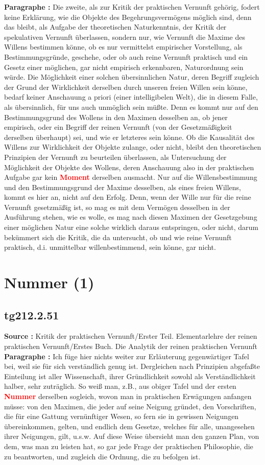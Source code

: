 \documentclass[a4paper,12pt,twoside]{book}
\newcommand{\match}[1]{\textcolor{red}{\textbf{#1}}}
\newcommand{\unnumberedsection}[1]{
	\section*{#1}
	\addcontentsline{toc}{section}{#1}
	\markright{#1}
}
\begin{document}
	\textbf{Paragraphe : }Die zweite, als zur Kritik der praktischen Vernunft gehörig, fodert keine Erklärung, wie die Objekte des Begehrungsvermögens möglich sind, denn das bleibt, als Aufgabe der theoretischen Naturkenntnis, der Kritik der spekulativen Vernunft überlassen, sondern nur, wie Vernunft die Maxime des Willens bestimmen könne, ob es nur vermittelst empirischer Vorstellung, als Bestimmungsgründe, geschehe, oder ob auch reine Vernunft praktisch und ein Gesetz einer möglichen, gar nicht empirisch erkennbaren, Naturordnung sein würde. Die Möglichkeit einer solchen übersinnlichen Natur, deren Begriff zugleich der Grund der Wirklichkeit derselben durch unseren freien Willen sein könne, bedarf keiner Anschauung a priori (einer intelligibelen Welt), die in diesem Falle, als übersinnlich, für uns auch unmöglich sein müßte. Denn es kommt nur auf den Bestimmungsgrund des Wollens in den Maximen desselben an, ob jener empirisch, oder ein Begriff der reinen Vernunft (von der Gesetzmäßigkeit derselben überhaupt) sei, und wie er letzteres sein könne. Ob die Kausalität des Willens zur Wirklichkeit der Objekte zulange, oder nicht, bleibt den theoretischen Prinzipien der Vernunft zu beurteilen überlassen, als Untersuchung der Möglichkeit der Objekte des Wollens, deren Anschauung also in der praktischen Aufgabe gar kein \match{Moment} derselben ausmacht. Nur auf die Willensbestimmung und den Bestimmungsgrund der Maxime desselben, als eines freien Willens, kommt es hier an, nicht auf den Erfolg. Denn,  wenn der Wille nur für die reine Vernunft gesetzmäßig ist, so mag es mit dem Vermögen desselben in der Ausführung stehen, wie es wolle, es mag nach diesen Maximen der Gesetzgebung einer möglichen Natur eine solche wirklich daraus entspringen, oder nicht, darum bekümmert sich die Kritik, die da untersucht, ob und wie reine Vernunft praktisch, d.i. unmittelbar willenbestimmend, sein könne, gar nicht. 
	
	\unnumberedsection{Nummer (1)} 
	\subsection*{tg212.2.51} 
	\textbf{Source : }Kritik der praktischen Vernunft/Erster Teil. Elementarlehre der reinen praktischen Vernunft/Erstes Buch. Die Analytik der reinen praktischen Vernunft\\  
	
	\textbf{Paragraphe : }
	Ich füge hier nichts weiter zur Erläuterung gegenwärtiger Tafel bei, weil sie für sich verständlich genug ist. Dergleichen nach Prinzipien abgefaßte Einteilung ist aller Wissenschaft, ihrer Gründlichkeit sowohl als Verständlichkeit halber, sehr zuträglich. So weiß man, z.B., aus obiger Tafel und der ersten \match{Nummer} derselben sogleich, wovon man in praktischen Erwägungen anfangen müsse: von den Maximen, die jeder auf seine Neigung gründet, den Vorschriften, die für eine Gattung vernünftiger Wesen, so fern sie in gewissen Neigungen übereinkommen, gelten, und endlich dem Gesetze, welches für alle, unangesehen ihrer Neigungen, gilt, u.s.w. Auf diese Weise übersieht man den ganzen Plan, von dem, was man zu leisten hat, so gar jede Frage der praktischen Philosophie, die zu beantworten, und zugleich die Ordnung, die zu befolgen ist. 
	
\end{document}
